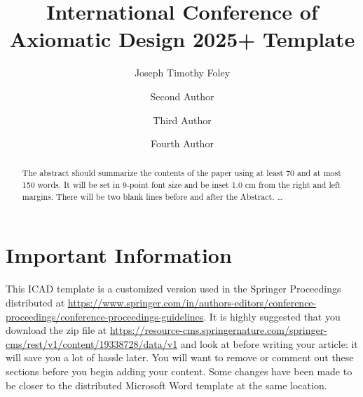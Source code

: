 \documentclass{svproc}
\begin{document}
\title{International Conference of Axiomatic Design 2025+ Template}


\author{Joseph Timothy Foley \and Second Author
\and Third Author \and Fourth Author}


\maketitle              %

\begin{abstract}
The abstract should summarize the contents of the paper
using at least 70 and at most 150 words. It will be set in 9-point
font size and be inset 1.0 cm from the right and left margins.
There will be two blank lines before and after the Abstract. \dots
\end{abstract}

\section*{Important Information}\label{sec:important-info}
This ICAD template is a customized version used in the Springer Proceedings distributed at \url{https://www.springer.com/in/authors-editors/conference-proceedings/conference-proceedings-guidelines}.
It is highly suggested that you download the zip file at \url{https://resource-cms.springernature.com/springer-cms/rest/v1/content/19338728/data/v1} and look at  before writing your article:  it will save you a lot of hassle later.
You will want to remove or comment out these sections before you begin adding your content.
Some changes have been made to be closer to the distributed Microsoft Word template at the same location.
\end{document}
